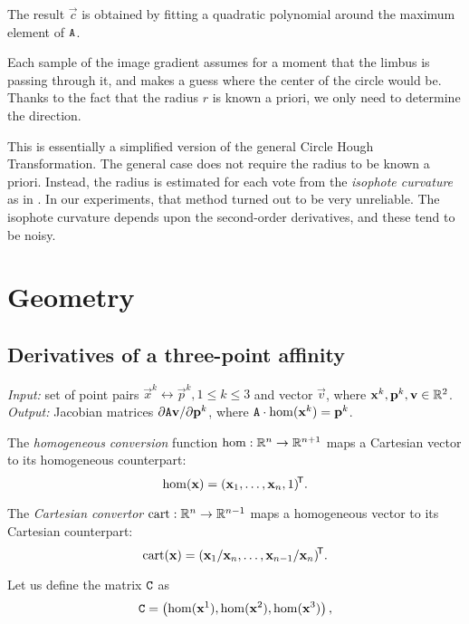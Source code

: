 The result $\vec c$ is obtained by fitting a quadratic polynomial around the maximum element of $\mathtt{A}$.

Each sample of the image gradient assumes for a moment that the limbus is passing through it, and makes a guess where the center of the circle would be.
Thanks to the fact that the radius $r$ is known a priori, we only need to determine the direction.

This is essentially a simplified version of the general Circle Hough Transformation.
The general case does not require the radius to be known a priori.
Instead, the radius is estimated for each vote from the \textit{isophote curvature} as in \cite{valenti08,leo14}.
In our experiments, that method turned out to be very unreliable.
The isophote curvature depends upon the second-order derivatives, and these tend to be noisy.

\section{Geometry}

\subsection{Derivatives of a three-point affinity}
\label{s:algo-daff}
\textit{Input:} set of point pairs $\vec x^k \leftrightarrow \vec p^k, 1 \leq k \leq 3$ and vector $\vec v$, where $\mathbf{x}^k, \mathbf{p}^k, \mathbf{v} \in \mathbb{R}^2$.\\
\textit{Output:} Jacobian matrices $\partial \mathtt{A} \mathbf{v} / \partial \mathbf{p}^k$, where $\mathtt{A} \cdot \mathrm{hom}(\mathbf{x}^k) = \mathbf{p}^k$.\\

\begin{definition} \label{d:hom}
The \textit{homogeneous conversion} function $\mathrm{hom}: \mathbb{R}^n \to \mathbb{R}^{n + 1}$ maps a Cartesian vector to its homogeneous counterpart:
$$
\mathrm{hom}(\mathbf{x}) = (\mathbf{x}_1, \dots, \mathbf{x}_n, 1)^{\!\mathsf{T}}.
$$
\end{definition}

\begin{definition} \label{d:cart}
The \textit{Cartesian convertor} $\mathrm{cart}: \mathbb{R}^n \to \mathbb{R}^{n - 1}$ maps a homogeneous vector to its Cartesian counterpart:
$$
\mathrm{cart}(\mathbf{x}) = (\mathbf{x}_1 / \mathbf{x}_n, \dots, \mathbf{x}_{n - 1} / \mathbf{x}_n)^{\!\mathsf{T}}.
$$
\end{definition}

Let us define the matrix $\mathtt{C}$ as 
\begin{equation}
\mathtt{C} = \left( \mathrm{hom}(\mathbf{x}^1), \mathrm{hom}(\mathbf{x}^2), \mathrm{hom}(\mathbf{x}^3) \right),
\end{equation}

